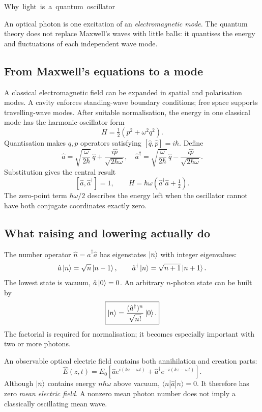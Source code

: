 \unit{Why light is a quantum oscillator}
\begin{intuition}
An optical photon is one excitation of an \emph{electromagnetic mode}.
The quantum theory does not replace Maxwell's waves with little balls:
it quantises the energy and fluctuations of each independent wave mode.
\end{intuition}
\subsection{From Maxwell's equations to a mode}
A classical electromagnetic field can be expanded in
spatial and polarisation modes. A cavity enforces standing-wave
boundary conditions; free space supports travelling-wave modes.
After suitable normalisation, the energy in one classical mode
has the harmonic-oscillator form
\[
H=\tfrac12(p^2+\omega^2q^2).
\]
Quantisation makes \(q,p\) operators satisfying
\([\hat q,\hat p]=i\hbar\). Define
\[
\hat a=\sqrt{\frac{\omega}{2\hbar}}\,\hat q
+\frac{i\hat p}{\sqrt{2\hbar\omega}},\quad
\hat a^\dagger=\sqrt{\frac{\omega}{2\hbar}}\,\hat q
-\frac{i\hat p}{\sqrt{2\hbar\omega}}.
\]
Substitution gives the central result
\[
\boxed{[\hat a,\hat a^\dagger]=1,\qquad
H=\hbar\omega\left(\hat a^\dagger\hat a+\tfrac12\right).}
\]
The zero-point term \(\hbar\omega/2\) describes the
energy left when the oscillator cannot have both conjugate
coordinates exactly zero.

\subsection{What raising and lowering actually do}
The number operator \(\hat n=\hat a^\dagger\hat a\)
has eigenstates \(\left\lvert n\right\rangle\) with integer eigenvalues:
\[
\hat a\left\lvert n\right\rangle=\sqrt n\left\lvert n-1\right\rangle,\qquad
\hat a^\dagger\left\lvert n\right\rangle=\sqrt{n+1}\left\lvert n+1\right\rangle.
\]
The lowest state is vacuum, \(\hat a\left\lvert 0\right\rangle=0\).
An arbitrary \(n\)-photon state can be built by
\[
\boxed{\left\lvert n\right\rangle=\frac{(\hat a^\dagger)^n}{\sqrt{n!}}\left\lvert 0\right\rangle.}
\]
The factorial is required for normalisation;
it becomes especially important with two or more photons.

An observable optical electric field contains both
annihilation and creation parts:
\[
\hat E(z,t)=E_0[
\hat a e^{i(kz-\omega t)}
+\hat a^\dagger e^{-i(kz-\omega t)}].
\]
Although \(\left\lvert n\right\rangle\) contains energy \(n\hbar\omega\)
above vacuum, \(\langle n|\hat a|n\rangle=0\).
It therefore has zero \emph{mean electric field}.
A nonzero mean photon number does not imply a
classically oscillating mean wave.

